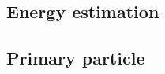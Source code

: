 \subsection{Energy estimation}
\label{ssec:energy-estimation}



\subsection{Primary particle}
\label{ssec:primary-particle}

